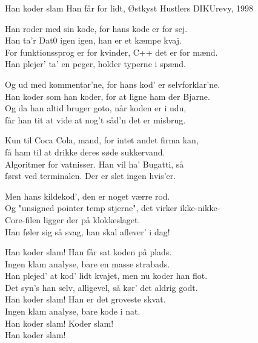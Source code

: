 \begin{song}{Han koder slam}
  {} %
  {Han får for lidt, Østkyst Hustlers} %
  {} %
  {DIKUrevy, 1998} %
  {\NotCCLIed} %

  \begin{SBVerse}
    Han roder med sin kode, for hans kode er for sej.\\
    Han ta'r Dat0 igen igen, han er et kæmpe kvaj.\\
    For funktionssprog er for kvinder, C++ det er for mænd.\\
    Han plejer' ta' en peger, holder typerne i spænd.
  \end{SBVerse}

  \begin{SBVerse}
    Og ud med kommentar'ne, for hans kod' er selvforklar'ne.\\
    Han koder som han koder, for at ligne ham der Bjarne.\\
    Og da han altid bruger goto, når koden er i udu,\\
    får han tit at vide at nog't såd'n det er misbrug.
  \end{SBVerse}

  \begin{SBVerse}
    Kun til Coca Cola, mand, for intet andet firma kan,\\
    få ham til at drikke deres søde sukkervand.\\
    Algoritmer for vatnisser. Han vil ha' Bugatti, så\\
    først ved terminalen. Der er slet ingen hvis'er.
  \end{SBVerse}

  \begin{SBVerse}
    Men hans kildekod', den er noget værre rod.\\
    Og "unsigned pointer temp stjerne", det virker ikke-nikke-\\
    Core-filen ligger der på klokkeslaget.\\
    Han føler sig så svag, han skal aflever' i dag!
  \end{SBVerse}

  \begin{SBChorus}
    Han koder slam! Han får sat koden på plads.\\
    Ingen klam analyse, bare en masse strabads.\\
    Han plejed' at kod' lidt kvajet, men nu koder han flot.\\
    Det syn's han selv, alligevel, så kør' det aldrig godt.\\
    Han koder slam! Han er det groveste skvat.\\
    Ingen klam analyse, bare kode i nat.\\
    Han koder slam! Koder slam!\\
    Han koder slam!
  \end{SBChorus}


\end{song}
